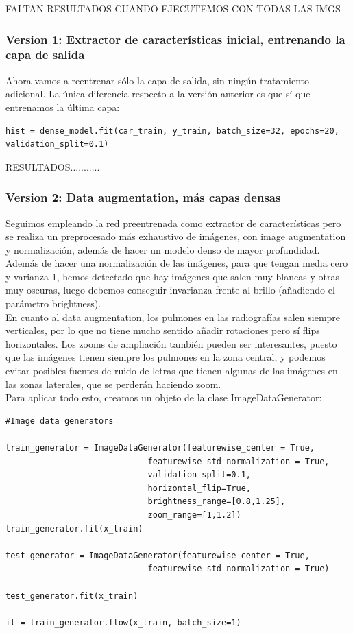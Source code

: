 \documentclass[11pt,a4paper]{article}
\theoremstyle{definition}
\begin{document}
FALTAN RESULTADOS CUANDO EJECUTEMOS CON TODAS LAS IMGS

\subsubsection{Version 1: Extractor de características inicial, entrenando la capa de salida}

Ahora vamos a reentrenar sólo la capa de salida, sin ningún tratamiento adicional. La única diferencia respecto a la versión anterior es que sí que entrenamos la última capa:

\begin{lstlisting}
hist = dense_model.fit(car_train, y_train, batch_size=32, epochs=20, validation_split=0.1)
\end{lstlisting}

RESULTADOS...........


\subsubsection{Version 2: Data augmentation, más capas densas}

Seguimos empleando la red preentrenada como extractor de características pero se realiza un preprocesado más exhaustivo de imágenes, con image augmentation y normalización, además de hacer un modelo denso de mayor profundidad.\\

Además de hacer una normalización de las imágenes, para que tengan media cero y varianza 1, hemos detectado que hay imágenes que salen muy blancas y otras muy oscuras, luego debemos conseguir invarianza frente al brillo (añadiendo el parámetro brightness).\\

En cuanto al data augmentation, los pulmones en las radiografías salen siempre verticales, por lo que no tiene mucho sentido añadir rotaciones pero sí flips horizontales. Los zooms de ampliación también pueden ser interesantes, puesto que las imágenes tienen siempre los pulmones en la zona central, y podemos evitar posibles fuentes de ruido de letras que tienen algunas de las imágenes en las zonas laterales, que se perderán haciendo zoom.\\

Para aplicar todo esto, creamos un objeto de la clase ImageDataGenerator:

\begin{lstlisting}
#Image data generators

train_generator = ImageDataGenerator(featurewise_center = True,
                             featurewise_std_normalization = True,
                             validation_split=0.1,
                             horizontal_flip=True,
                             brightness_range=[0.8,1.25],
                             zoom_range=[1,1.2])
train_generator.fit(x_train)

test_generator = ImageDataGenerator(featurewise_center = True,
                             featurewise_std_normalization = True)

test_generator.fit(x_train)

it = train_generator.flow(x_train, batch_size=1)
\end{lstlisting}
\end{document}
